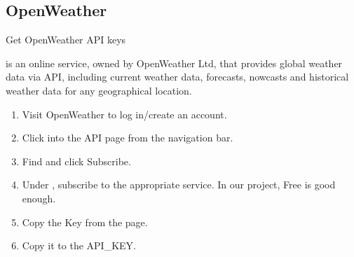 \documentclass[a4paper,11pt,english]{sphinxmanual}
\begin{document}
\subsection{OpenWeather}
\label{\detokenize{Extension_Project/Real-time_Weather_OLED:openweather}}
\sphinxAtStartPar
Get OpenWeather API keys

\sphinxAtStartPar
{} is an online service, owned by OpenWeather Ltd, that provides global weather data via API, including current weather data, forecasts, nowcasts and historical weather data for any geographical location.
\begin{enumerate}
%
\item {} 
\sphinxAtStartPar
Visit OpenWeather to log in/create an account.

\noindent{}

\item {} 
\sphinxAtStartPar
Click into the API page from the navigation bar.

\noindent{}

\item {} 
\sphinxAtStartPar
Find  and click Subscribe.

\noindent{}

\item {} 
\sphinxAtStartPar
Under , subscribe to the appropriate service. In our project, Free is good enough.

\noindent{}

\item {} 
\sphinxAtStartPar
Copy the Key from the  page.

\noindent{}

\item {} 
\sphinxAtStartPar
Copy it to the  API\_KEY.

\begin{sphinxVerbatim}[commandchars=\\\{\}]
\end{sphinxVerbatim}


\end{enumerate}
\end{document}
